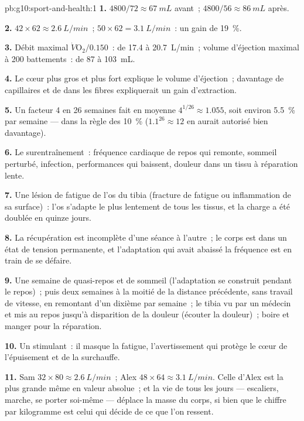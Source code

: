\begin{solution}{pb:g10:sport-and-health:1}
\textbf{1.} $4800/72 \approx \qty{67}{mL}$ avant~; $4800/56 \approx
\qty{86}{mL}$ après.

\textbf{2.} $42 \times 62 \approx \qty{2.6}{L/min}$~; $50 \times 62 =
\qty{3.1}{L/min}$~: un gain de 19~\%.

\textbf{3.} Débit maximal $\dot V\!\mathrm{O_2}/0.150$~: de \num{17.4}
à \qty{20.7}{L/min}~; volume d'éjection maximal à 200 battements~: de
\num{87} à \qty{103}{mL}.

\textbf{4.} Le cœur plus gros et plus fort explique le volume
d'éjection~; davantage de capillaires et de  dans les
fibres expliquerait un gain d'extraction.

\textbf{5.} Un facteur 4 en 26 semaines fait en moyenne $4^{1/26}
\approx 1.055$, soit environ 5.5~\% par semaine --- dans la règle des 10~\%
($1.1^{26}
\approx 12$ en aurait autorisé bien davantage).

\textbf{6.} Le surentraînement~: fréquence cardiaque de repos qui
remonte, sommeil perturbé, infection, performances qui baissent,
douleur dans un tissu à réparation lente.

\textbf{7.} Une lésion de fatigue de l'os du tibia (fracture de fatigue
ou inflammation de sa surface)~: l'os s'adapte le plus lentement de
tous les tissus, et la charge a été doublée en quinze jours.

\textbf{8.} La récupération est incomplète d'une séance à l'autre~; le
corps est dans un état de tension permanente, et l'adaptation qui avait
abaissé la fréquence est en train de se défaire.

\textbf{9.} Une semaine de quasi-repos et de sommeil (l'adaptation se
construit pendant le repos)~; puis deux semaines à la moitié de la
distance précédente, sans travail de vitesse, en remontant d'un dixième
par semaine~; le tibia vu par un médecin et mis au repos jusqu'à
disparition de la douleur (écouter la douleur)~; boire et manger pour
la réparation.

\textbf{10.} Un stimulant~: il masque la fatigue, l'avertissement qui
protège le cœur de l'épuisement et de la surchauffe.

\textbf{11.} Sam $32 \times 80 \approx \qty{2.6}{L/min}$~; Alex $48
\times 64 \approx \qty{3.1}{L/min}$. Celle d'Alex est la plus grande
même en valeur absolue~; et la vie de tous les jours --- escaliers,
marche, se porter soi-même --- déplace la masse du corps, si bien que
le chiffre par kilogramme est celui qui décide de ce que l'on ressent.


\end{solution}
